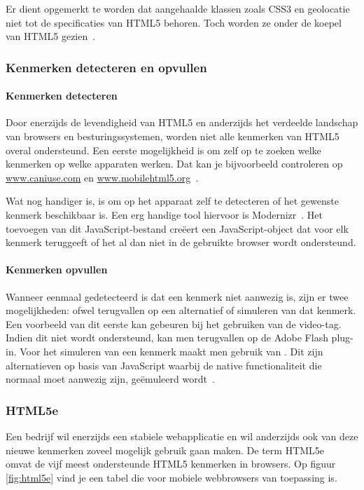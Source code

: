 Er dient opgemerkt te worden dat aangehaalde klassen zoals CSS3 en geolocatie niet tot de specificaties van HTML5 behoren. Toch worden ze onder de koepel van HTML5 gezien~\cite{MacDonald2011}.

\subsubsection{Kenmerken detecteren en opvullen}
\paragraph{Kenmerken detecteren}
Door enerzijds de levendigheid van HTML5 en anderzijds het verdeelde landschap van browsers en besturingssystemen, worden niet alle kenmerken van HTML5 overal ondersteund. Een eerste mogelijkheid is om zelf op te zoeken welke kenmerken op welke apparaten werken. Dat kan je bijvoorbeeld controleren op \url{www.caniuse.com} en \url{www.mobilehtml5.org}~\cite{MacDonald2011}. 

Wat nog handiger is, is om op het apparaat zelf te detecteren of het gewenste kenmerk beschikbaar is. Een erg handige tool hiervoor is Modernizr~\cite{Modernizr2012}. Het toevoegen van dit JavaScript-bestand creëert een JavaScript-object dat voor elk kenmerk teruggeeft of het al dan niet in de gebruikte browser wordt ondersteund.

\paragraph{Kenmerken opvullen}
Wanneer eenmaal gedetecteerd is dat een kenmerk niet aanwezig is, zijn er twee mogelijkheden: ofwel terugvallen op een alternatief of simuleren van dat kenmerk. Een voorbeeld van dit eerste kan gebeuren bij het gebruiken van de video-tag. Indien dit niet wordt ondersteund, kan men terugvallen op de Adobe Flash plug-in. Voor het simuleren van een kenmerk maakt men gebruik van . Dit zijn alternatieven op basis van JavaScript waarbij de native functionaliteit die normaal moet aanwezig zijn, geëmuleerd wordt~\cite{MacDonald2011,Weyl2011}.

\subsubsection{HTML5e}
Een bedrijf wil enerzijds een stabiele webapplicatie en wil anderzijds ook van deze nieuwe kenmerken zoveel mogelijk gebruik gaan maken. De term HTML5e~\cite{Hales2012} omvat de vijf meest ondersteunde HTML5 kenmerken in browsers. Op figuur \ref{fig:html5e} vind je een tabel die voor mobiele webbrowsers van toepassing is.

